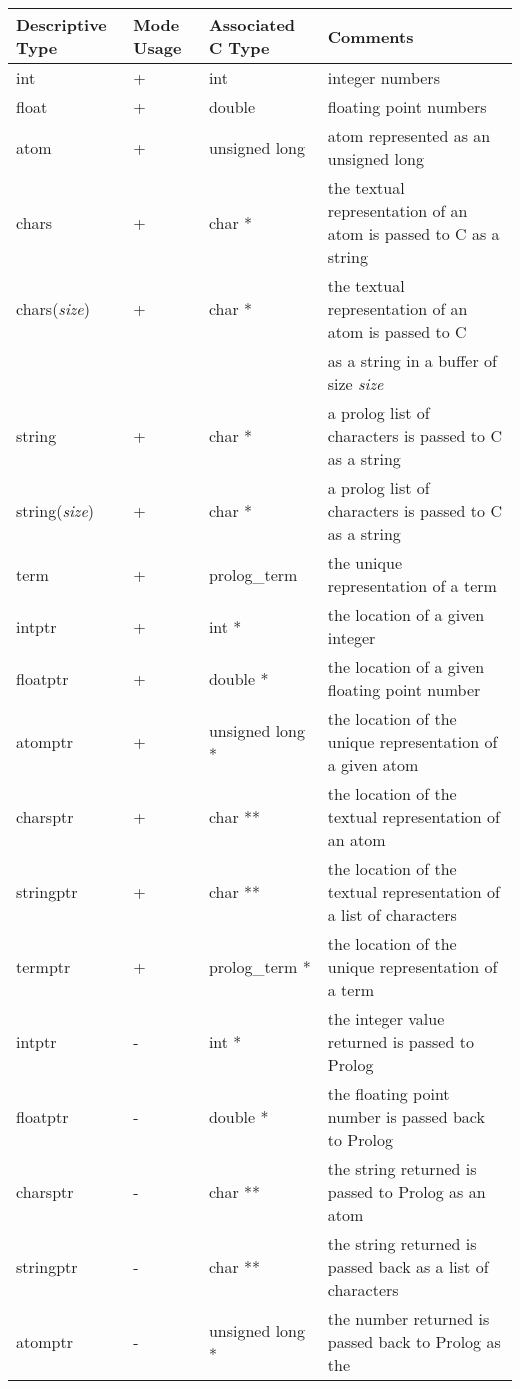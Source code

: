 \begin{table}
\label{table:hltypes}
\scriptsize
\begin{tabular}{||l|l|l|l||}
\hline
\hline
Descriptive Type & Mode Usage & Associated C Type & Comments\\ 
\hline
\hline
int & + & int  & integer numbers \\
float & + & double & floating point numbers \\
atom & + & unsigned long & atom represented as an unsigned long\\
chars & + & char * & the textual representation of an atom is passed
to C as a string \\
chars(\emph{size}) & + & char * & the textual representation of an
atom is passed to C \\
& & & as a string in a buffer of size \emph{size} \\ 
string & + & char * & a prolog list of characters is passed to C as a
string \\
string(\emph{size}) & + & char * & a prolog list of characters is
passed to C as a string \\
term & + & prolog\_term  & the unique representation of a term\\
intptr & + & int * & the location of a given integer\\
floatptr & + & double * & the location of a given floating point
number \\
atomptr & + & unsigned long * & the location of the unique
representation of a given atom \\
charsptr & + & char ** & the location of the textual representation of
an atom \\
stringptr & + & char ** & the location of the textual representation
of a list of characters \\
termptr & + & prolog\_term * & the location of the unique
representation of a term \\
\hline
intptr & - & int * & the integer value returned is passed to Prolog \\
floatptr & - & double * & the floating point number is passed back to
Prolog \\
charsptr & - & char ** & the string returned is passed to Prolog as an
atom \\
stringptr & - & char ** & the string returned is passed back as a list
of characters \\
atomptr & - & unsigned long * & the number returned is passed back to
Prolog as the \\

\end{tabular}
\end{table}
